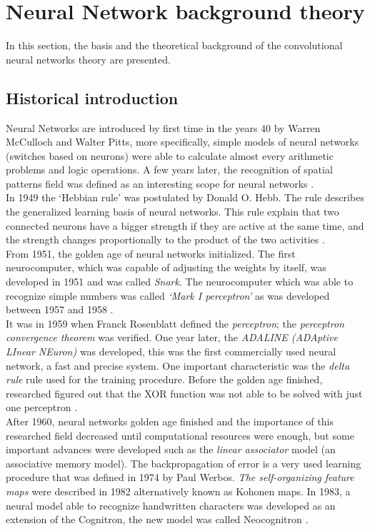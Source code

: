 \section{Neural Network background theory}
In this section, the basis and the theoretical background of the convolutional neural networks theory are presented.\\

\subsection{Historical introduction}
Neural Networks are introduced by first time in the years 40 by Warren McCulloch and Walter Pitts, more specifically, simple models of neural networks (switches based on neurons) were able to calculate almost every arithmetic problems and logic operations. A few years later, the recognition of spatial patterns field was defined as an interesting scope for neural networks \cite{BINN}.\\

In 1949 the `Hebbian rule' was postulated by Donald O. Hebb. The rule describes the generalized learning basis of neural networks. This rule explain that two connected neurons have  a bigger strength if they are active at the same time, and the strength changes proportionally to the product of the two activities \cite{BINN}.\\

From 1951, the golden age of neural networks initialized. The first neurocomputer, which was capable of adjusting the weights by itself, was developed in 1951 and was called \textit{Snark}. The neurocomputer which was able to recognize simple numbers was called \textit{`Mark I perceptron'} as was developed between 1957 and 1958 \cite{BINN}.\\

It was in 1959 when Franck Rosenblatt defined the \textit{perceptron}; the \textit{perceptron convergence theorem} was verified. One year later, the \textit{ADALINE (ADAptive LInear NEuron)} was developed, this was the first commercially used neural network, a fast and precise system. One important characteristic was the \textit{delta rule} rule used for the training procedure. Before the golden age finished, researched figured out that the XOR function was not able to be solved with just one perceptron \cite{BINN}.\\

After 1960, neural networks golden age finished and the importance of this researched field decreased until computational resources were enough, but some important advances were developed such as the \textit{linear associator} model (an associative memory model). The backpropagation of error is a very used learning procedure that was defined in 1974 by Paul Werbos. \textit{The self-organizing feature maps} were described in 1982 alternatively known as Kohonen maps. In 1983, a neural model able to recognize handwritten characters was developed as an extension of the Cognitron, the new model was called Neocognitron \cite{BINN}.\\

